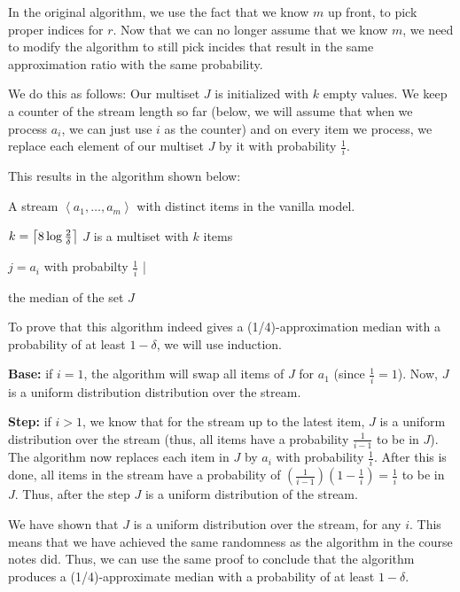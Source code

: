 In the original algorithm, we use the fact that we know $m$ up front, to pick proper indices for $r$.
Now that we can no longer assume that we know $m$, we need to modify the algorithm to still pick incides that result in the same approximation ratio with the same probability.

We do this as follows:
Our multiset $J$ is initialized with $k$ empty values.
We keep a counter of the stream length so far (below, we will assume that when we process $a_i$, we can just use $i$ as the counter) and on every item we process, we replace each element of our multiset $J$ by it with probability $\frac{1}{i}$.

This results in the algorithm shown below:
\begin{sourcecode}
A stream $\left<a_1, \ldots, a_m\right>$ with distinct items in the vanilla model.
\qend

$k = \ceil*{8 \log{\frac{2}{\delta}}}$
$J$ is a multiset with $k$ items
\qend

	$j = a_i$ with probabilty $\frac{1}{i}$
|
\qend

\return the median of the set $J$
\qend
\end{sourcecode}

To prove that this algorithm indeed gives a (1/4)-approximation median with a probability of at least $1-\delta$, we will use induction.

\textbf{Base:} if $i = 1$, the algorithm will swap all items of $J$ for $a_1$ (since $\frac{1}{i} = 1$). Now, $J$ is a uniform distribution distribution over the stream.

\textbf{Step:} if $i > 1$, we know that for the stream up to the latest item, $J$ is a uniform distribution over the stream (thus, all items have a probability $\frac{1}{i-1}$ to be in $J$).
The algorithm now replaces each item in $J$ by $a_i$ with probability $\frac{1}{i}$.
After this is done, all items in the stream have a probability of $(\frac{1}{i-1}) (1-\frac{1}{i}) = \frac{1}{i}$ to be in $J$.
Thus, after the step $J$ is a uniform distribution of the stream.

We have shown that $J$ is a uniform distribution over the stream, for any $i$.
This means that we have achieved the same randomness as the algorithm in the course notes did.
Thus, we can use the same proof to conclude that the algorithm produces a (1/4)-approximate median with a probability of at least $1 - \delta$.
